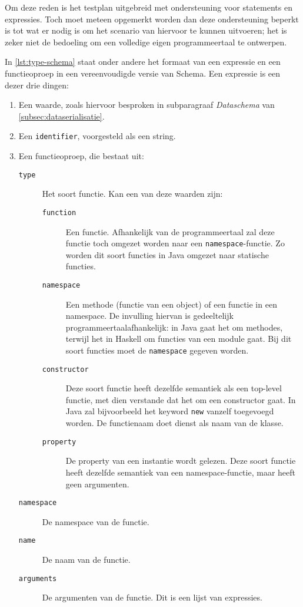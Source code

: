 \inputminted{java}{code/assignment.jshell}

Om deze reden is het testplan uitgebreid met ondersteuning voor statements en expressies.
Toch moet meteen opgemerkt worden dan deze ondersteuning beperkt is tot wat er nodig is om het scenario van hiervoor te kunnen uitvoeren;
het is zeker niet de bedoeling om een volledige eigen programmeertaal te ontwerpen.

In \cref{lst:type-schema} staat onder andere het formaat van een expressie en een functieoproep in een vereenvoudigde versie van  Schema.
Een expressie is een dezer drie dingen:
\begin{enumerate}
    \item Een waarde, zoals hiervoor besproken in subparagraaf \emph{Dataschema} van \cref{subsec:dataserialisatie}.
    \item Een \texttt{identifier}, voorgesteld als een string.
    \item Een functieoproep, die bestaat uit:
    \begin{description}
        \item[\texttt{type}] Het soort functie.
        Kan een van deze waarden zijn:
        \begin{description}
            \item[\texttt{function}] Een  functie.
            Afhankelijk van de programmeertaal zal deze functie toch omgezet worden naar een \texttt{namespace}-functie.
            Zo worden dit soort functies in Java omgezet naar statische functies.
            \item[\texttt{namespace}] Een methode (functie van een object) of een functie in een namespace.
            De invulling hiervan is gedeeltelijk programmeertaalafhankelijk: in Java gaat het om methodes, terwijl het in Haskell om functies van een module gaat.
            Bij dit soort functies moet de \texttt{namespace} gegeven worden.
            \item[\texttt{constructor}] Deze soort functie heeft dezelfde semantiek als een top-level functie, met dien verstande dat het om een constructor gaat.
            In Java zal bijvoorbeeld het keyword \texttt{new} vanzelf toegevoegd worden.
            De functienaam doet dienst als naam van de klasse.
            \item[\texttt{property}] De property van een instantie wordt gelezen.
            Deze soort functie heeft dezelfde semantiek van een namespace-functie, maar heeft geen argumenten.
        \end{description}
        \item[\texttt{namespace}] De namespace van de functie.
        \item[\texttt{name}] De naam van de functie.
        \item[\texttt{arguments}] De argumenten van de functie.
        Dit is een lijst van expressies.
    \end{description}
\end{enumerate}

